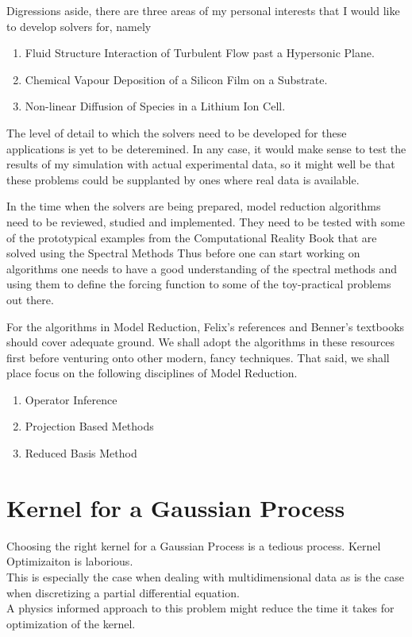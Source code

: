 \documentclass{article}
\begin{document}
Digressions aside, there are three areas of my personal interests that I would like to develop solvers for, namely
\begin{enumerate}
    \item Fluid Structure Interaction of Turbulent Flow past a Hypersonic Plane.
    \item Chemical Vapour Deposition of a Silicon Film on a Substrate.
    \item Non-linear Diffusion of Species in a Lithium Ion Cell.
\end{enumerate}

The level of detail to which the solvers need to be developed for these applications is yet to be deteremined.
In any case, it would make sense to test the results of my simulation with actual experimental data, so it might well be that these problems could be supplanted by ones where real data is available.

In the time when the solvers are being prepared, model reduction algorithms need to be reviewed, studied and implemented.
They need to be tested with some of the prototypical examples from the Computational Reality Book that are solved using the Spectral Methods
Thus before one can start working on algorithms one needs to have a good understanding of the spectral methods and using them to define the forcing function to some of the toy-practical problems out there.

For the algorithms in Model Reduction, Felix's references and Benner's textbooks should cover adequate ground. We shall adopt the algorithms in these resources first before venturing onto other modern, fancy techniques.
That said, we shall place focus on the following disciplines of Model Reduction.
\begin{enumerate}
    \item Operator Inference
    \item Projection Based Methods
    \item Reduced Basis Method
\end{enumerate}



\section{Kernel for a Gaussian Process}
Choosing the right kernel for a Gaussian Process is a tedious process. Kernel Optimizaiton is laborious. \\ 
This is especially the case when dealing with multidimensional data as is the case when discretizing a partial differential equation. \\ 
A physics informed approach to this problem might reduce the time it takes for optimization of the kernel. \\ 
\end{document}
